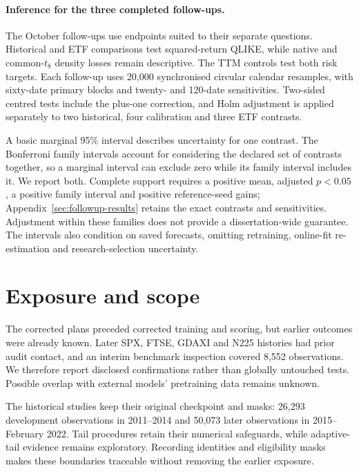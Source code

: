 \paragraph{Inference for the three completed follow-ups.}
The October follow-ups use endpoints suited to their separate questions. Historical and ETF comparisons test squared-return QLIKE, while native and common-$t_8$ density losses remain descriptive. The TTM controls test both risk targets. Each follow-up uses 20,000 synchronised circular calendar resamples, with sixty-date primary blocks and twenty- and 120-date sensitivities. Two-sided centred tests include the plus-one correction, and Holm adjustment is applied separately to two historical, four calibration and three ETF contrasts.

A basic marginal 95\% interval describes uncertainty for one contrast. The Bonferroni family intervals account for considering the declared set of contrasts together, so a marginal interval can exclude zero while its family interval includes it. We report both. Complete support requires a positive mean, adjusted $p<0.05$, a positive family interval and positive reference-seed gains; Appendix~\ref{sec:followup-results} retains the exact contrasts and sensitivities. Adjustment within these families does not provide a dissertation-wide guarantee. The intervals also condition on saved forecasts, omitting retraining, online-fit re-estimation and research-selection uncertainty.

\section{Exposure and scope}
\label{sec:exposure}

The corrected plans preceded corrected training and scoring, but earlier outcomes were already known. Later SPX, FTSE, GDAXI and N225 histories had prior audit contact, and an interim benchmark inspection covered 8,552 observations. We therefore report disclosed confirmations rather than globally untouched tests. Possible overlap with external models' pretraining data remains unknown.

The historical studies keep their original checkpoint and masks: 26,293 development observations in 2011--2014 and 50,073 later observations in 2015--February 2022. Tail procedures retain their numerical safeguards, while adaptive-tail evidence remains exploratory. Recording identities and eligibility masks makes these boundaries traceable without removing the earlier exposure.

